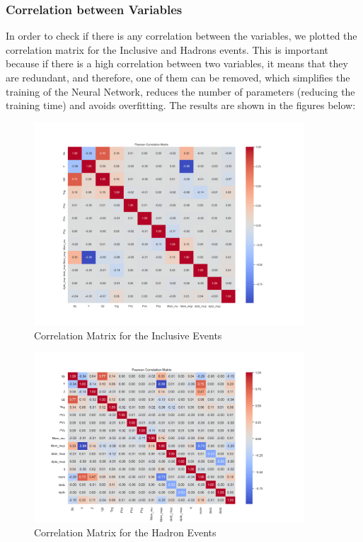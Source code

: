 \documentclass{article}
\begin{document}
\subsubsection*{Correlation between Variables}
In order to check if there is any correlation between the variables, we plotted the correlation matrix for the Inclusive and Hadrons events.
This is important because if there is a high correlation between two variables, it means that they are redundant, and therefore, one of them can be removed, 
which simplifies the training of the Neural Network, reduces the number of parameters (reducing the training time) and avoids overfitting.
The results are shown in the figures below:

\begin{figure}[H]
    \centering
    \includegraphics[width=0.9\textwidth]{graphs/inclusive_correlation_matrix.png}
    \caption{Correlation Matrix for the Inclusive Events}
    \label{fig:inclusive_correlation_matrix}
\end{figure}

\begin{figure}[H]
    \centering
    \includegraphics[width=0.9\textwidth]{graphs/hadron_correlation_matrix.png}
    \caption{Correlation Matrix for the Hadron Events}
    \label{fig:hadron_correlation_matrix}
\end{figure}
\end{document}
